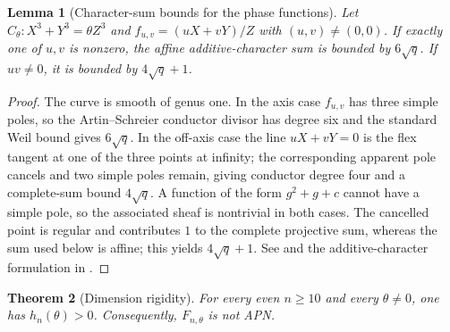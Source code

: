 \documentclass[pdflatex,sn-mathphys-num]{sn-jnl}
\theoremstyle{thmstyleone}
\newtheorem{theorem}{Theorem}[section]
\newtheorem{lemma}[theorem]{Lemma}
\theoremstyle{thmstyletwo}
\theoremstyle{thmstylethree}
\begin{document}
\begin{lemma}[Character-sum bounds for the phase functions]\label{lem:charsum}
Let $C_\theta:X^3+Y^3=\theta Z^3$ and $f_{u,v}=(uX+vY)/Z$ with $(u,v)\ne(0,0)$. If exactly one of $u,v$ is nonzero, the affine additive-character sum is bounded by $6\sqrt q$. If $uv\ne0$, it is bounded by $4\sqrt q+1$.
\end{lemma}
\begin{proof}
The curve is smooth of genus one. In the axis case $f_{u,v}$ has three simple poles, so the Artin--Schreier conductor divisor has degree six and the standard Weil bound gives $6\sqrt q$. In the off-axis case the line $uX+vY=0$ is the flex tangent at one of the three points at infinity; the corresponding apparent pole cancels and two simple poles remain, giving conductor degree four and a complete-sum bound $4\sqrt q$. A function of the form $g^2+g+c$ cannot have a simple pole, so the associated sheaf is nontrivial in both cases. The cancelled point is regular and contributes $1$ to the complete projective sum, whereas the sum used below is affine; this yields $4\sqrt q+1$. See \cite[Thm.~5.2.3]{Stichtenoth2009} and the additive-character formulation in \cite{Lachaud1992}.
\end{proof}

\begin{theorem}[Dimension rigidity]\label{thm:uniform}
For every even $n\ge10$ and every $\theta\ne0$, one has $h_n(\theta)>0$.  Consequently, $F_{n,\theta}$ is not APN.
\end{theorem}
\end{document}
